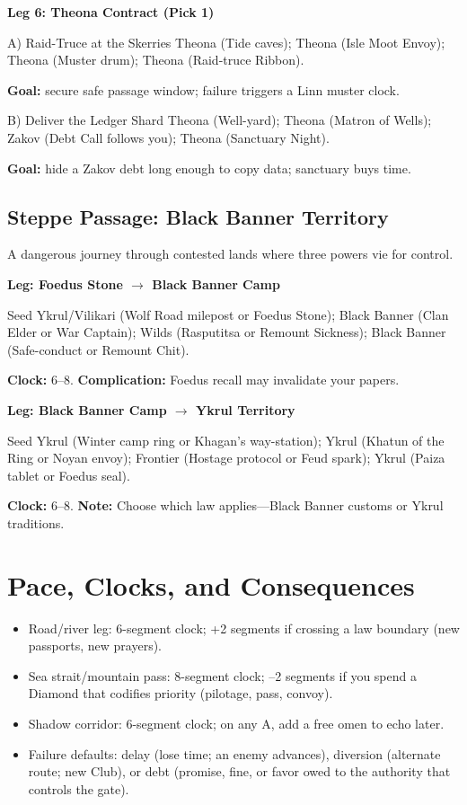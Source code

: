 \textbf{Leg 6: Theona Contract (Pick 1)}
\begin{Leg}{A) Raid-Truce at the Skerries}
Theona \SuitSpade{} (Tide caves);
Theona \SuitHeart{} (Isle Moot Envoy);
Theona \SuitClub{} (Muster drum);
Theona \SuitDiamond{} (Raid-truce Ribbon).
\end{Leg}
\textbf{Goal:} secure safe passage window; failure triggers a Linn muster clock.

\begin{Leg}{B) Deliver the Ledger Shard}
Theona \SuitSpade{} (Well-yard);
Theona \SuitHeart{} (Matron of Wells);
Zakov \SuitClub{} (Debt Call follows you);
Theona \SuitDiamond{} (Sanctuary Night).
\end{Leg}
\textbf{Goal:} hide a Zakov debt long enough to copy data; sanctuary buys time.

\subsection{Steppe Passage: Black Banner Territory}
A dangerous journey through contested lands where three powers vie for control.

\textbf{Leg: Foedus Stone $\rightarrow$ Black Banner Camp}
\begin{Leg}{Seed}
Ykrul/Vilikari \SuitSpade{} (Wolf Road milepost or Foedus Stone);
Black Banner \SuitHeart{} (Clan Elder or War Captain);
Wilds \SuitClub{} (Rasputitsa or Remount Sickness);
Black Banner \SuitDiamond{} (Safe-conduct or Remount Chit).
\end{Leg}
\textbf{Clock:} 6--8. \textbf{Complication:} Foedus recall may invalidate your papers.

\textbf{Leg: Black Banner Camp $\rightarrow$ Ykrul Territory}
\begin{Leg}{Seed}
Ykrul \SuitSpade{} (Winter camp ring or Khagan's way-station);
Ykrul \SuitHeart{} (Khatun of the Ring or Noyan envoy);
Frontier \SuitClub{} (Hostage protocol or Feud spark);
Ykrul \SuitDiamond{} (Paiza tablet or Foedus seal).
\end{Leg}
\textbf{Clock:} 6--8. \textbf{Note:} Choose which law applies---Black Banner customs or Ykrul traditions.

\section{Pace, Clocks, and Consequences}

\begin{itemize}
\item Road/river leg: 6-segment clock; +2 segments if crossing a law boundary (new passports, new prayers).
\item Sea strait/mountain pass: 8-segment clock; --2 segments if you spend a Diamond that codifies priority (pilotage, pass, convoy).
\item Shadow corridor: 6-segment clock; on any A, add a free omen to echo later.
\item Failure defaults: delay (lose time; an enemy advances), diversion (alternate route; new Club), or debt (promise, fine, or favor owed to the authority that controls the gate).
\end{itemize}

